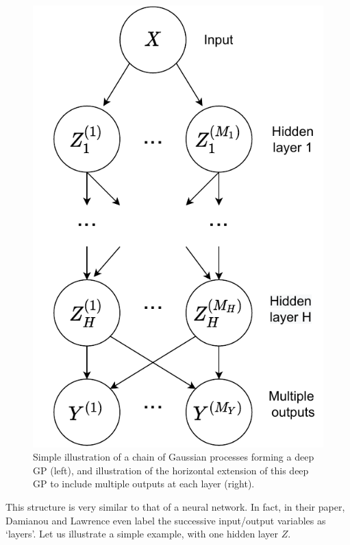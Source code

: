 \documentclass[a4paper,12pt]{article}
\begin{document}
\begin{figure}[H]
\begin{center}
\begin{minipage}[r]{.24\linewidth}
\end{minipage}
\begin{minipage}[l]{.4\linewidth}
    \centering
    \includegraphics[width = \linewidth]{deep_mogp.pdf}
\end{minipage}
\caption{Simple illustration of a chain of Gaussian processes forming a deep GP (left), and illustration of the horizontal extension of this deep GP to include multiple outputs at each layer (right).}
\label{fig:deep_gp}
\end{center}
\end{figure}
\noindent This structure is very similar to that of a neural network. In fact, in their paper, Damianou and Lawrence even label the successive input/output variables as `layers'. Let us illustrate a simple example, with one hidden layer $Z$.\\
\end{document}
